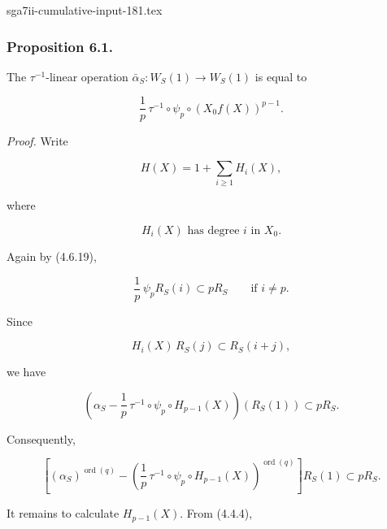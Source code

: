 \begin{filecontents*}{sga7ii-cumulative-input-181.tex}
\subsubsection*{Proposition 6.1.}
The $\tau^{-1}$-linear operation
$\bar\alpha_S:W_S(1)\to W_S(1)$ is equal to

\begin{equation}\tag{6.1.1}
\frac1p\,\tau^{-1}\circ\psi_p\circ(X_0f(X))^{p-1}.
\end{equation}

\noindent\emph{Proof.}
Write

\begin{equation}\tag{6.1.2}
H(X)=1+\sum_{i\geq1}H_i(X),
\end{equation}

where

\begin{equation}\tag{6.1.3}
H_i(X)\text{ has degree $i$ in }X_0.
\end{equation}

Again by (4.6.19),

\begin{equation}\tag{6.1.4}
\frac1p\,\psi_pR_S(i)\subset pR_S
\qquad\text{if }i\ne p.
\end{equation}

Since

\begin{equation}\tag{6.1.5}
H_i(X)\,R_S(j)\subset R_S(i+j),
\end{equation}

we have

\begin{equation}\tag{6.1.6}
\left(
\alpha_S-\frac1p\,\tau^{-1}\circ\psi_p\circ H_{p-1}(X)
\right)(R_S(1))
\subset pR_S.
\end{equation}

Consequently,

\begin{equation}\tag{6.1.7}
\left[
(\alpha_S)^{\operatorname{ord}(q)}
-
\left(
\frac1p\,\tau^{-1}\circ\psi_p\circ H_{p-1}(X)
\right)^{\operatorname{ord}(q)}
\right]R_S(1)
\subset pR_S.
\end{equation}

It remains to calculate $H_{p-1}(X)$.  From (4.4.4),


\end{filecontents*}
